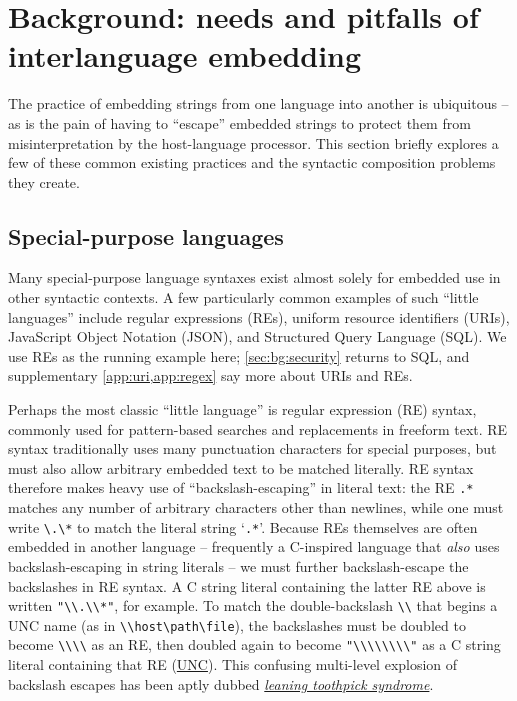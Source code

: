 \section{Background: needs and pitfalls of interlanguage embedding}
\label{sec:bg}

The practice of
embedding strings from one language into another
is ubiquitous --
as is the pain of having to ``escape'' embedded strings
to protect them from misinterpretation by the host-language processor.
This section briefly explores a few of these common existing practices
and the syntactic composition problems they create.

\subsection{Special-purpose languages}

Many special-purpose language syntaxes exist
almost solely for embedded use in other syntactic contexts.
A few particularly common examples of such ``little languages''
include regular expressions (REs),
uniform resource identifiers (URIs),
JavaScript Object Notation (JSON),
and Structured Query Language (SQL).
We use REs as the running example here;
\cref{sec:bg:security} returns to SQL,
and supplementary \cref{app:uri,app:regex} say more about URIs and REs.

Perhaps the most classic ``little language'' is regular expression (RE) syntax,
commonly used for pattern-based searches and replacements in freeform text.
RE syntax traditionally uses many punctuation characters for special purposes,
but must also allow arbitrary embedded text to be matched literally.
RE syntax therefore makes heavy use of ``backslash-escaping'' in literal text:
\eg the RE \verb|.*|
matches any number of arbitrary characters other than newlines,
while one must write \verb|\.\*| to match the literal string `\verb|.*|'.
Because REs themselves are often embedded in another language --
frequently a C-inspired language that \emph{also} uses backslash-escaping
in string literals --
we must further backslash-escape the backslashes in RE syntax.
A C string literal containing the latter RE above
is written \verb|"\\.\\*"|,
for example.
To match the double-backslash \verb|\\| that begins
a UNC name (as in \verb|\\host\path\file|),
the backslashes must be doubled to become \verb|\\\\| as an RE,
then doubled again to become \verb|"\\\\\\\\"| as a C string literal
containing that RE (\href{https://en.wikipedia.org/wiki/Path_(computing)#Universal_Naming_Convention}{UNC}).
This confusing multi-level explosion of backslash escapes
has been aptly dubbed
\href{https://en.wikipedia.org/wiki/Leaning_toothpick_syndrome}{\emph{leaning toothpick syndrome}}.

